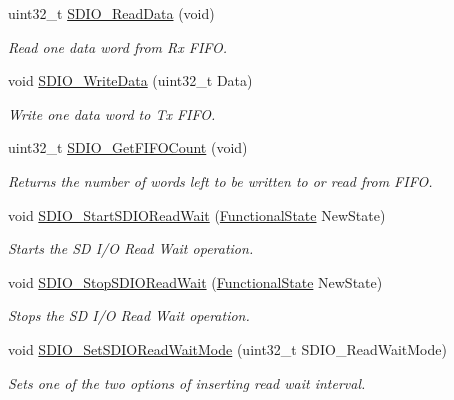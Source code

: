 \begin{DoxyCompactItemize}
uint32\+\_\+t \mbox{\hyperlink{group___s_d_i_o___private___functions_ga4e8ac755ef3c31ecd4ed2708df19187e}{S\+D\+I\+O\+\_\+\+Read\+Data}} (void)
\begin{DoxyCompactList}\small\item\em Read one data word from Rx F\+I\+FO. \end{DoxyCompactList}\item 
void \mbox{\hyperlink{group___s_d_i_o___private___functions_ga361008b5252aa33b5f2b5823ee3d7240}{S\+D\+I\+O\+\_\+\+Write\+Data}} (uint32\+\_\+t Data)
\begin{DoxyCompactList}\small\item\em Write one data word to Tx F\+I\+FO. \end{DoxyCompactList}\item 
uint32\+\_\+t \mbox{\hyperlink{group___s_d_i_o___private___functions_ga9a3343983a2d68b5164a1c89797d2dd6}{S\+D\+I\+O\+\_\+\+Get\+F\+I\+F\+O\+Count}} (void)
\begin{DoxyCompactList}\small\item\em Returns the number of words left to be written to or read from F\+I\+FO. \end{DoxyCompactList}\item 
void \mbox{\hyperlink{group___s_d_i_o___private___functions_gac88f914d9a68a83abc2265ec8a7b79fc}{S\+D\+I\+O\+\_\+\+Start\+S\+D\+I\+O\+Read\+Wait}} (\mbox{\hyperlink{group___exported__types_gac9a7e9a35d2513ec15c3b537aaa4fba1}{Functional\+State}} New\+State)
\begin{DoxyCompactList}\small\item\em Starts the SD I/O Read Wait operation. \end{DoxyCompactList}\item 
void \mbox{\hyperlink{group___s_d_i_o___private___functions_gaca6b25eb2debb73ac827c66f0ebcf837}{S\+D\+I\+O\+\_\+\+Stop\+S\+D\+I\+O\+Read\+Wait}} (\mbox{\hyperlink{group___exported__types_gac9a7e9a35d2513ec15c3b537aaa4fba1}{Functional\+State}} New\+State)
\begin{DoxyCompactList}\small\item\em Stops the SD I/O Read Wait operation. \end{DoxyCompactList}\item 
void \mbox{\hyperlink{group___s_d_i_o___private___functions_ga2baac4ea1bb6c2d94345d2712604338a}{S\+D\+I\+O\+\_\+\+Set\+S\+D\+I\+O\+Read\+Wait\+Mode}} (uint32\+\_\+t S\+D\+I\+O\+\_\+\+Read\+Wait\+Mode)
\begin{DoxyCompactList}\small\item\em Sets one of the two options of inserting read wait interval. \end{DoxyCompactList}\item 

\end{DoxyCompactItemize}
